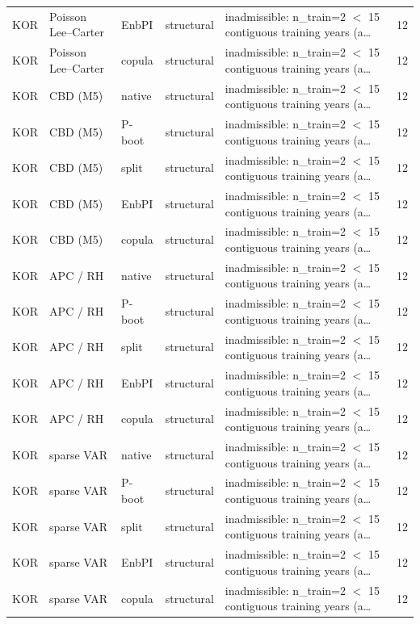 {\begin{longtable}{@{}lllp{1.6cm}p{6.2cm}r@{}}
KOR & Poisson Lee--Carter & EnbPI & structural & inadmissible: n\_train=2 $<$ 15 contiguous training years (a\ldots & 12 \\
KOR & Poisson Lee--Carter & copula & structural & inadmissible: n\_train=2 $<$ 15 contiguous training years (a\ldots & 12 \\
KOR & CBD (M5) & native & structural & inadmissible: n\_train=2 $<$ 15 contiguous training years (a\ldots & 12 \\
KOR & CBD (M5) & P-boot & structural & inadmissible: n\_train=2 $<$ 15 contiguous training years (a\ldots & 12 \\
KOR & CBD (M5) & split & structural & inadmissible: n\_train=2 $<$ 15 contiguous training years (a\ldots & 12 \\
KOR & CBD (M5) & EnbPI & structural & inadmissible: n\_train=2 $<$ 15 contiguous training years (a\ldots & 12 \\
KOR & CBD (M5) & copula & structural & inadmissible: n\_train=2 $<$ 15 contiguous training years (a\ldots & 12 \\
KOR & APC / RH & native & structural & inadmissible: n\_train=2 $<$ 15 contiguous training years (a\ldots & 12 \\
KOR & APC / RH & P-boot & structural & inadmissible: n\_train=2 $<$ 15 contiguous training years (a\ldots & 12 \\
KOR & APC / RH & split & structural & inadmissible: n\_train=2 $<$ 15 contiguous training years (a\ldots & 12 \\
KOR & APC / RH & EnbPI & structural & inadmissible: n\_train=2 $<$ 15 contiguous training years (a\ldots & 12 \\
KOR & APC / RH & copula & structural & inadmissible: n\_train=2 $<$ 15 contiguous training years (a\ldots & 12 \\
KOR & sparse VAR & native & structural & inadmissible: n\_train=2 $<$ 15 contiguous training years (a\ldots & 12 \\
KOR & sparse VAR & P-boot & structural & inadmissible: n\_train=2 $<$ 15 contiguous training years (a\ldots & 12 \\
KOR & sparse VAR & split & structural & inadmissible: n\_train=2 $<$ 15 contiguous training years (a\ldots & 12 \\
KOR & sparse VAR & EnbPI & structural & inadmissible: n\_train=2 $<$ 15 contiguous training years (a\ldots & 12 \\
KOR & sparse VAR & copula & structural & inadmissible: n\_train=2 $<$ 15 contiguous training years (a\ldots & 12 \\

\end{longtable}}
